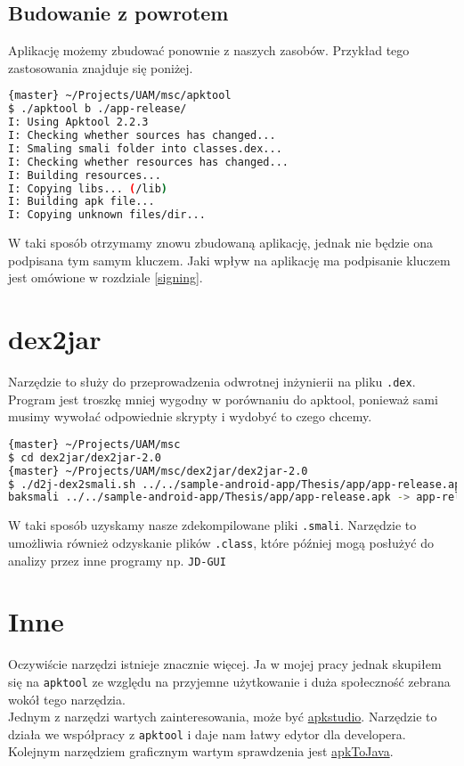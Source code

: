 \documentclass[12pt,a4paper,leqno,oneside,titlepage]{book}
\begin{document}
\subsection{Budowanie z powrotem}
Aplikację możemy zbudować ponownie z naszych zasobów. Przykład tego zastosowania znajduje się poniżej.

\begin{lstlisting}[language=bash]
{master} ~/Projects/UAM/msc/apktool
$ ./apktool b ./app-release/
I: Using Apktool 2.2.3
I: Checking whether sources has changed...
I: Smaling smali folder into classes.dex...
I: Checking whether resources has changed...
I: Building resources...
I: Copying libs... (/lib)
I: Building apk file...
I: Copying unknown files/dir...
\end{lstlisting}
W taki sposób otrzymamy znowu zbudowaną aplikację, jednak nie będzie ona podpisana tym samym kluczem. Jaki wpływ na aplikację ma podpisanie kluczem jest omówione w rozdziale \ref{signing}.

\section{dex2jar}
Narzędzie to służy do przeprowadzenia odwrotnej inżynierii na pliku \lstinline|.dex|. Program jest troszkę mniej wygodny w porównaniu do apktool, ponieważ sami musimy wywołać odpowiednie skrypty i wydobyć to czego chcemy.

\begin{lstlisting}[language=bash]
{master} ~/Projects/UAM/msc
$ cd dex2jar/dex2jar-2.0
{master} ~/Projects/UAM/msc/dex2jar/dex2jar-2.0
$ ./d2j-dex2smali.sh ../../sample-android-app/Thesis/app/app-release.apk
baksmali ../../sample-android-app/Thesis/app/app-release.apk -> app-release-out
\end{lstlisting}
W taki sposób uzyskamy nasze zdekompilowane pliki \verb|.smali|. Narzędzie to umożliwia również odzyskanie plików \verb|.class|, które później mogą posłużyć do analizy przez inne programy np. \verb|JD-GUI|
%
\section{Inne}
Oczywiście narzędzi istnieje znacznie więcej. Ja w mojej pracy jednak skupiłem się na \verb|apktool| ze względu na przyjemne użytkowanie i duża społeczność zebrana wokół tego narzędzia.\\
Jednym z narzędzi wartych zainteresowania, może być \href{http://vaibhavpandey.com/apkstudio/}{apkstudio}. Narzędzie to działa we współpracy z \verb|apktool| i daje nam łatwy edytor dla developera.\\
Kolejnym narzędziem graficznym wartym sprawdzenia jest \href{https://github.com/ajitsing/apkToJava}{apkToJava}.
\end{document}
